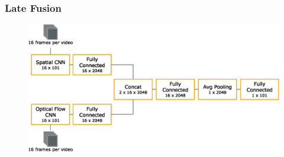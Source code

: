 \subsubsection{Late Fusion}


\begin{figure}[!htb]
	\centering
	\includegraphics[scale=.7]{images/late_fusion.eps}
	\caption{}
	\label{fig:late_fusion}
\end{figure}